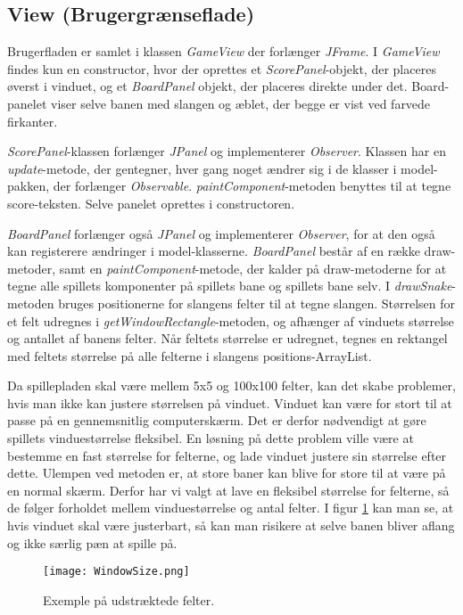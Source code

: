 \subsection{View (Brugergrænseflade)}
Brugerfladen er samlet i klassen \textit{GameView} der forlænger \textit{JFrame}. I \textit{GameView} findes kun en constructor, hvor der oprettes et \textit{ScorePanel}-objekt, der placeres øverst i vinduet, og et \textit{BoardPanel} objekt, der placeres direkte under det. Board-panelet viser selve banen med slangen og æblet, der begge er vist ved farvede firkanter. 

\textit{ScorePanel}-klassen forlænger \textit{JPanel} og implementerer \textit{Observer}. Klassen har en \textit{update}-metode, der gentegner, hver gang noget ændrer sig i de klasser i model-pakken, der forlænger \textit{Observable}. 
\textit{paintComponent}-metoden benyttes til at tegne score-teksten. Selve panelet oprettes i constructoren.

\textit{BoardPanel} forlænger også \textit{JPanel} og implementerer \textit{Observer}, for at den også kan registerere ændringer i model-klasserne. \textit{BoardPanel} består af en række draw-metoder, samt en \textit{paintComponent}-metode, der kalder på draw-metoderne for at tegne alle spillets komponenter på spillets bane og spillets bane selv.
I \textit{drawSnake}-metoden bruges positionerne for slangens felter til at tegne slangen. Størrelsen for et felt udregnes i \textit{getWindowRectangle}-metoden, og afhænger af vinduets størrelse og antallet af banens felter. Når feltets størrelse er udregnet, tegnes en rektangel med feltets størrelse på alle felterne i slangens positions-ArrayList.

Da spillepladen skal være mellem 5x5 og 100x100 felter, kan det skabe problemer, hvis man ikke kan justere størrelsen på vinduet. Vinduet kan være for stort til at passe på en gennemsnitlig computerskærm. Det er derfor nødvendigt at gøre spillets vinduestørrelse fleksibel. En løsning på dette problem ville være at bestemme en fast størrelse for felterne, og lade vinduet justere sin størrelse efter dette. Ulempen ved metoden er, at store baner kan blive for store til at være på en normal skærm. Derfor har vi valgt at lave en fleksibel størrelse for felterne, så de følger forholdet mellem vinduestørrelse og antal felter.
I figur \ref{fig:windowsize} kan man se, at hvis vinduet skal være justerbart, så kan man risikere at selve banen bliver aflang og ikke særlig pæn at spille på.

\begin{figure}[h]
	\centering
	\graphicspath{ {pics/} }
	\texttt{[image: WindowSize.png]}
	\label{fig:windowsize}
	\caption{Exemple på udstræktede felter.}
\end{figure}

